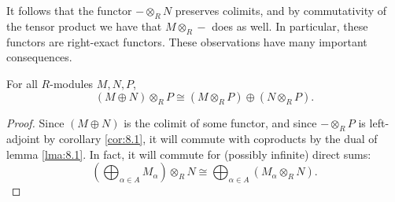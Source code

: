 It follows that the functor $-\otimes_R N$ preserves colimits, and by commutativity of the tensor product we have that $M\otimes_R -$ does as well. In particular, these functors are right-exact functors. These observations have many important consequences.
\begin{corollary}\label{cor:8.2}
	For all $R$-modules $M,N,P$,
	\[
		(M\oplus N)\otimes_R P \cong (M\otimes_R P)\oplus (N \otimes_R P)
	.\]
\end{corollary}
\begin{proof}
	Since $(M\oplus N)$ is the colimit of some functor, and since $-\otimes_R P$ is left-adjoint by corollary \ref{cor:8.1}, it will commute with coproducts by the dual of lemma \ref{lma:8.1}. In fact, it will commute for (possibly infinite) direct sums:
	\[
		\left( \bigoplus_{\alpha \in A} M_\alpha  \right) \otimes_R N \cong \bigoplus_{\alpha \in A}\left( M_\alpha \otimes_R N \right) 
	.\]
\end{proof}

